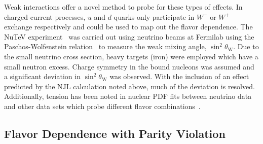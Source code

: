 Weak interactions offer a novel method to probe for these types of effects.  In charged-current processes, $u$ and $d$ quarks only participate in $W^-$ or $W^+$ exchange respectively and could be used to map out the flavor dependence.  The NuTeV experiment~\cite{Zeller:2001hh} was carried out using neutrino beams at Fermilab using the Paschos-Wolfenstein relation~\cite{Paschos:1972kj} to measure the weak mixing angle, $\sin^2\theta_\mathrm{W}$.  Due to the small neutrino cross section, heavy targets (iron) were employed which have a small neutron excess.  Charge symmetry in the bound nucleons was assumed and a significant deviation in $\sin^2\theta_\mathrm{W}$ was observed.  With the inclusion of an effect predicted by the NJL calculation noted above, much of the deviation is resolved.  Additionally, tension has been noted in nuclear PDF fits between neutrino data and other data sets which probe different flavor combinations~\cite{Schienbein:2009kk}.

\subsection{Flavor Dependence with Parity Violation}

